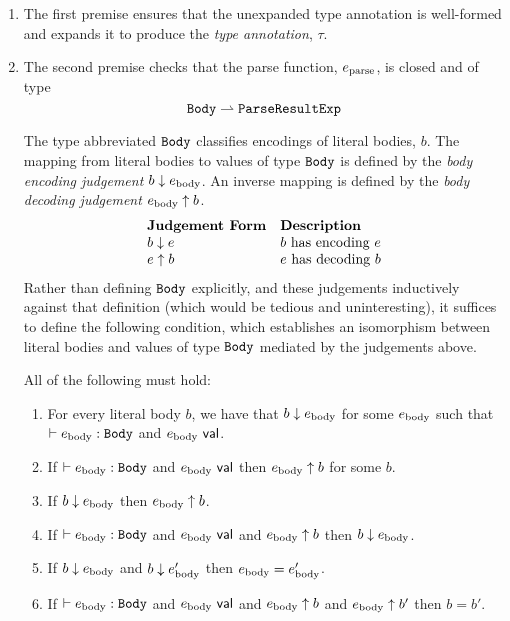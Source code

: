 \begin{enumerate}
\item The first premise ensures that the unexpanded type annotation is well-formed and expands it to produce the \emph{type annotation}, $\tau$.

\item The second premise checks that the parse function, $e_\text{parse}$, is closed and of type \[\mathtt{Body} \rightharpoonup \mathtt{ParseResultExp}\] %

The type abbreviated $\mathtt{Body}$ classifies encodings of literal bodies, $b$. The mapping from literal bodies to values of type $\mathtt{Body}$ is defined by the \emph{body encoding judgement} $b \downarrow e_\text{body}$. An inverse mapping is defined   by the \emph{body decoding judgement} $e_\text{body} \uparrow b$.
\[\begin{array}{ll}
\textbf{Judgement Form} & \textbf{Description}\\
b \downarrow e & \text{$b$ has encoding $e$}\\
e \uparrow b & \text{$e$ has decoding $b$}
\end{array}\]
Rather than defining $\mathtt{Body}$ explicitly, and these judgements inductively against that definition (which would be tedious and uninteresting), it suffices to define the following condition, which establishes an isomorphism between literal bodies and values of type $\mathtt{Body}$ mediated by the judgements above.
\begin{condition} All of the following must hold:
\begin{enumerate}
\item For every literal body $b$, we have that $b \downarrow e_\text{body}$ for some $e_\text{body}$ such that $\vdash e_\text{body} : \mathtt{Body}$ and $e_\text{body}~\mathsf{val}$.
\item If $\vdash e_\text{body} : \mathtt{Body}$ and $e_\text{body}~\mathsf{val}$ then $e_\text{body} \uparrow b$ for some $b$.
\item If $b \downarrow e_\text{body}$ then $e_\text{body} \uparrow b$.
\item If $\vdash e_\text{body} : \mathtt{Body}$ and $e_\text{body}~\mathsf{val}$ and $e_\text{body} \uparrow b$ then $b \downarrow e_\text{body}$. 
\item If $b \downarrow e_\text{body}$ and $b \downarrow e_\text{body}'$ then $e_\text{body} = e_\text{body}'$.
\item If $\vdash e_\text{body} : \mathtt{Body}$ and $e_\text{body}~\mathsf{val}$ and $e_\text{body} \uparrow b$ and $e_\text{body} \uparrow b'$ then $b=b'$.
\end{enumerate}
\end{condition}


\end{enumerate}
